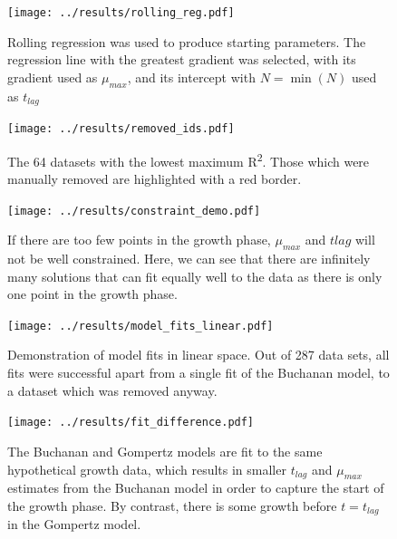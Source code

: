 \documentclass[11pt, a4paper]{article}
\begin{document}
        
        \begin{figure}[H]
        \centering
        \texttt{[image: ../results/rolling\_reg.pdf]}
        \caption{Rolling regression was used to produce starting parameters. The regression line with the greatest gradient was selected, with its gradient used as $\mu_{max}$, and its intercept with $N = \min(N)$ used as $t_{lag}$ }
        \label{sup:rolling_regression}
        \end{figure}  
        
        
         \begin{figure}[H]
        \texttt{[image: ../results/removed\_ids.pdf]}
        \caption{The 64 datasets with the lowest maximum R\textsuperscript{2}. Those which were manually removed are highlighted with a red border.}
        \label{sup:removed_ids}
        \end{figure}
        
         \begin{figure}[H]
        \texttt{[image: ../results/constraint\_demo.pdf]}
        \centering
        \caption{If there are too few points in the growth phase, $\mu_{max}$ and $t{lag}$ will not be well constrained. Here, we can see that there are infinitely many solutions that can fit equally well to the data as there is only one point in the growth phase. }
        \label{sup:constraint}
        \end{figure}  


         \begin{figure}[H]
         \centering
        \texttt{[image: ../results/model\_fits\_linear.pdf]}
        \caption{Demonstration of model fits in linear space. Out of 287 data sets, all fits were successful apart from a single fit of the Buchanan model, to a dataset which was removed anyway.}
        \label{sup:model_fits_linear}
        \end{figure}

         \begin{figure}[H]
        \texttt{[image: ../results/fit\_difference.pdf]}
        \centering
        \caption{The Buchanan and Gompertz models are fit to the same hypothetical growth data, which results in smaller $t_{lag}$ and $\mu_{max}$ estimates from the Buchanan model in order to capture the start of the growth phase. By contrast, there is some growth before $t = t_{lag}$ in the Gompertz model.}
        \label{sup:fit_difference}
        \end{figure} 
        
\end{document}
